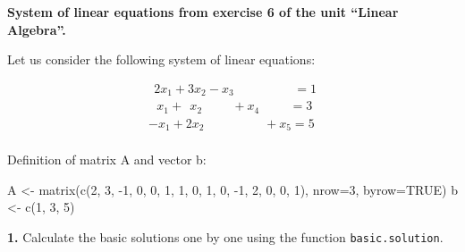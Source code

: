 \documentclass[
]{article}
\newenvironment{Shaded}{\begin{snugshade}}{\end{snugshade}}
\newcommand{\AttributeTok}[1]{\textcolor[rgb]{0.77,0.63,0.00}{#1}}
\newcommand{\ConstantTok}[1]{\textcolor[rgb]{0.00,0.00,0.00}{#1}}
\newcommand{\DecValTok}[1]{\textcolor[rgb]{0.00,0.00,0.81}{#1}}
\newcommand{\FunctionTok}[1]{\textcolor[rgb]{0.00,0.00,0.00}{#1}}
\newcommand{\NormalTok}[1]{#1}
\newcommand{\OtherTok}[1]{\textcolor[rgb]{0.56,0.35,0.01}{#1}}
\newcommand{\SpecialCharTok}[1]{\textcolor[rgb]{0.00,0.00,0.00}{#1}}
\begin{document}
\textbf{System of linear equations from exercise 6 of the unit ``Linear
Algebra''.}

Let us consider the following system of linear equations:

\[
\begin{array}{l}
      \ \ 2x_{1}+3x_{2}-x_3 \hspace{2cm}= 1    \\
      \ \ \ x_{1}+\ \ x_{2} \hspace{1cm}+x_{4}\hspace{1cm}=3 \\
      -x_{1}+2x_{2}\hspace{2cm}+x_{5}=5 \\
      \end{array}
\]

Definition of matrix A and vector b:

\begin{Shaded}
\begin{Highlighting}[]
\NormalTok{A }\OtherTok{\textless{}{-}} \FunctionTok{matrix}\NormalTok{(}\FunctionTok{c}\NormalTok{(}\DecValTok{2}\NormalTok{, }\DecValTok{3}\NormalTok{, }\SpecialCharTok{{-}}\DecValTok{1}\NormalTok{, }\DecValTok{0}\NormalTok{, }\DecValTok{0}\NormalTok{, }\DecValTok{1}\NormalTok{, }\DecValTok{1}\NormalTok{, }\DecValTok{0}\NormalTok{, }\DecValTok{1}\NormalTok{, }\DecValTok{0}\NormalTok{, }\SpecialCharTok{{-}}\DecValTok{1}\NormalTok{, }\DecValTok{2}\NormalTok{, }\DecValTok{0}\NormalTok{, }\DecValTok{0}\NormalTok{, }\DecValTok{1}\NormalTok{), }\AttributeTok{nrow=}\DecValTok{3}\NormalTok{, }\AttributeTok{byrow=}\ConstantTok{TRUE}\NormalTok{)}
\NormalTok{b }\OtherTok{\textless{}{-}} \FunctionTok{c}\NormalTok{(}\DecValTok{1}\NormalTok{, }\DecValTok{3}\NormalTok{, }\DecValTok{5}\NormalTok{)}
\end{Highlighting}
\end{Shaded}

\textbf{1.} Calculate the basic solutions one by one using the function
\texttt{basic.solution}.
\end{document}
